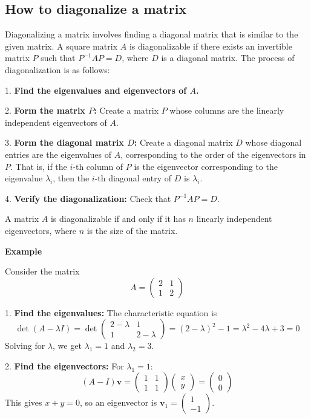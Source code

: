 \subsection{How to diagonalize a matrix}

Diagonalizing a matrix involves finding a diagonal matrix that is similar to the given matrix. A square matrix \(A\) is diagonalizable if there exists an invertible matrix \(P\) such that \(P^{-1}AP = D\), where \(D\) is a diagonal matrix.
The process of diagonalization is as follows:

 1.  \textbf{Find the eigenvalues and eigenvectors of \(A\).\/}

 2.  \textbf{Form the matrix \(P\):}
    Create a matrix \(P\) whose columns are the linearly independent eigenvectors of \(A\).

     3.  \textbf{Form the diagonal matrix \(D\):}
    Create a diagonal matrix \(D\) whose diagonal entries are the eigenvalues of \(A\), corresponding to the order of the eigenvectors in \(P\). That is, if the \(i\)-th column of \(P\) is the eigenvector corresponding to the eigenvalue \(\lambda_i\), then the \(i\)-th diagonal entry of \(D\) is \(\lambda_i\).

     4.  \textbf{Verify the diagonalization:}
    Check that \(P^{-1}AP = D\).

A matrix \(A\) is diagonalizable if and only if it has \(n\) linearly independent eigenvectors, where \(n\) is the size of the matrix.

\textbf{Example}

Consider the matrix
\[
A = \begin{pmatrix}
2 & 1 \\
1 & 2
\end{pmatrix}
\]

1.  \textbf{Find the eigenvalues:}
    The characteristic equation is
    \[
    \det(A - \lambda I) = \det \begin{pmatrix}
    2 - \lambda & 1 \\
    1 & 2 - \lambda
    \end{pmatrix} = (2 - \lambda)^2 - 1 = \lambda^2 - 4\lambda + 3 = 0
    \]
    Solving for \(\lambda\), we get \(\lambda_1 = 1\) and \(\lambda_2 = 3\).

2.  \textbf{Find the eigenvectors:}
    For \(\lambda_1 = 1\):
    \[
    (A - I)\mathbf{v} = \begin{pmatrix}
    1 & 1 \\
    1 & 1
    \end{pmatrix} \begin{pmatrix}
    x \\
    y
    \end{pmatrix} = \begin{pmatrix}
    0 \\
    0
    \end{pmatrix}
    \]
    This gives \(x + y = 0\), so an eigenvector is \(\mathbf{v}_1 = \begin{pmatrix} 1 \\ -1 \end{pmatrix}\).

